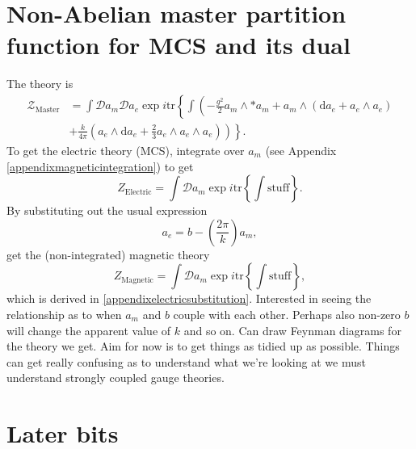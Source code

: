 \documentclass{article}
\begin{document}
\section{Non-Abelian master partition function for MCS and its dual}
The theory is
\begin{align}
    \label{Eq: Master equation}
    \mathcal{Z}_{\text{Master}}&= \int \mathcal{D}a_{m}\mathcal{D}a_{e}\exp i \text{tr}\left\{\int \left(-\frac{g^{2}}{2}a_{m}\wedge * a_{m} \right.\right. + a_{m}\wedge \left(\mathrm{d}a_{e} + a_{e}\wedge a_{e} \right) \nonumber \\
    &+ \left.\left.\frac{k}{4\pi}\left(a_{e}\wedge \mathrm{d}a_{e} + \frac{2}{3}a_{e}\wedge a_{e}\wedge a_{e} \right)\right)\right\}.
\end{align}
To get the electric theory (MCS), integrate over $a_{m}$ (see Appendix \ref{appendixmagneticintegration}) to get
\begin{equation}
    Z_{\text{Electric}} = \int \mathcal{D}a_{m}\exp i \text{tr}\left\{\int \text{stuff}\right\}.
\end{equation}
By substituting out the usual expression
\begin{equation}
    a_{e} = b - \left(\frac{2\pi}{k} \right)a_{m}, 
\end{equation}
get the (non-integrated) magnetic theory
\begin{equation}
    Z_{\text{Magnetic}} = \int \mathcal{D}a_{m}\exp i \text{tr}\left\{\int \text{stuff}\right\},
\end{equation}
which is derived in \ref{appendixelectricsubstitution}. Interested in seeing the relationship as to when $a_{m}$ and $b$ couple with each other. Perhaps also non-zero $b$ will change the apparent value of $k$ and so on. Can draw Feynman diagrams for the theory we get. Aim for now is to get things as tidied up as possible. Things can get really confusing as to understand what we're looking at we must understand strongly coupled gauge theories. 




\section{Later bits}





\appendix
\end{document}
